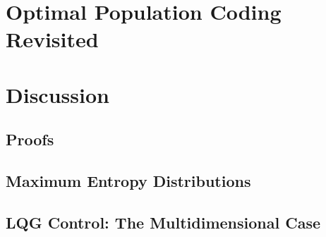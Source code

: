 \documentclass[phd, titlesmallcaps, examinerscopy, copyrightpage, foronline]{mqthesis_v23/mqthesis}
\begin{document}
\chapter{Optimal Population Coding Revisited}

\label{chap:optimal}



\chapter{Discussion}

 
\backmatter


\printbibliography

\begin{appendices}

\chapter{Proofs}
\section{Maximum Entropy Distributions}
\label{app:entropy}

\section{LQG Control: The Multidimensional Case}
\label{app:lqg}

\end{appendices}




%
\end{document}
